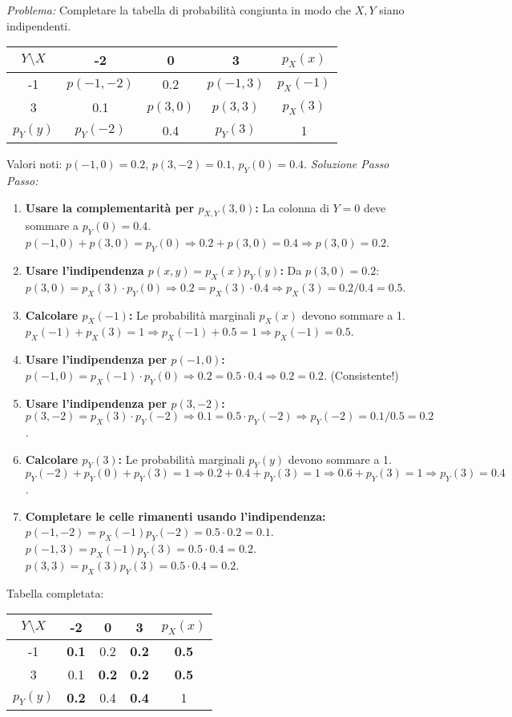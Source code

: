 \begin{example}
\textit{Problema:} Completare la tabella di probabilità congiunta in modo che $X, Y$ siano indipendenti.
\begin{center}
\begin{tabular}{c|ccc|c}
$Y \setminus X$ & -2 & 0 & 3 & $p_X(x)$ \\ \hline
-1 & $p(-1,-2)$ & 0.2 & $p(-1,3)$ & $p_X(-1)$ \\
3 & 0.1 & $p(3,0)$ & $p(3,3)$ & $p_X(3)$ \\ \hline
$p_Y(y)$ & $p_Y(-2)$ & 0.4 & $p_Y(3)$ & 1
\end{tabular}
\end{center}
Valori noti: $p(-1,0)=0.2$, $p(3,-2)=0.1$, $p_Y(0)=0.4$.
\textit{Soluzione Passo Passo:}
\begin{enumerate}
    \item \textbf{Usare la complementarità per $p_{X,Y}(3,0)$:}
    La colonna di $Y=0$ deve sommare a $p_Y(0)=0.4$.
    $p(-1,0) + p(3,0) = p_Y(0) \Rightarrow 0.2 + p(3,0) = 0.4 \Rightarrow p(3,0) = 0.2$.
    \item \textbf{Usare l'indipendenza $p(x,y) = p_X(x)p_Y(y)$:}
    Da $p(3,0) = 0.2$: $p(3,0) = p_X(3) \cdot p_Y(0) \Rightarrow 0.2 = p_X(3) \cdot 0.4 \Rightarrow p_X(3) = 0.2/0.4 = 0.5$.
    \item \textbf{Calcolare $p_X(-1)$:}
    Le probabilità marginali $p_X(x)$ devono sommare a 1.
    $p_X(-1) + p_X(3) = 1 \Rightarrow p_X(-1) + 0.5 = 1 \Rightarrow p_X(-1) = 0.5$.
    \item \textbf{Usare l'indipendenza per $p(-1,0)$:}
    $p(-1,0) = p_X(-1) \cdot p_Y(0) \Rightarrow 0.2 = 0.5 \cdot 0.4 \Rightarrow 0.2 = 0.2$. (Consistente!)
    \item \textbf{Usare l'indipendenza per $p(3,-2)$:}
    $p(3,-2) = p_X(3) \cdot p_Y(-2) \Rightarrow 0.1 = 0.5 \cdot p_Y(-2) \Rightarrow p_Y(-2) = 0.1/0.5 = 0.2$.
    \item \textbf{Calcolare $p_Y(3)$:}
    Le probabilità marginali $p_Y(y)$ devono sommare a 1.
    $p_Y(-2) + p_Y(0) + p_Y(3) = 1 \Rightarrow 0.2 + 0.4 + p_Y(3) = 1 \Rightarrow 0.6 + p_Y(3) = 1 \Rightarrow p_Y(3) = 0.4$.
    \item \textbf{Completare le celle rimanenti usando l'indipendenza:}
    $p(-1,-2) = p_X(-1)p_Y(-2) = 0.5 \cdot 0.2 = 0.1$.
    $p(-1,3) = p_X(-1)p_Y(3) = 0.5 \cdot 0.4 = 0.2$.
    $p(3,3) = p_X(3)p_Y(3) = 0.5 \cdot 0.4 = 0.2$.
\end{enumerate}
Tabella completata:
\begin{center}
\begin{tabular}{c|ccc|c}
$Y \setminus X$ & -2 & 0 & 3 & $p_X(x)$ \\ \hline
-1 & \textbf{0.1} & 0.2 & \textbf{0.2} & \textbf{0.5} \\
3 & 0.1 & \textbf{0.2} & \textbf{0.2} & \textbf{0.5} \\ \hline
$p_Y(y)$ & \textbf{0.2} & 0.4 & \textbf{0.4} & 1
\end{tabular}
\end{center}
\end{example}

